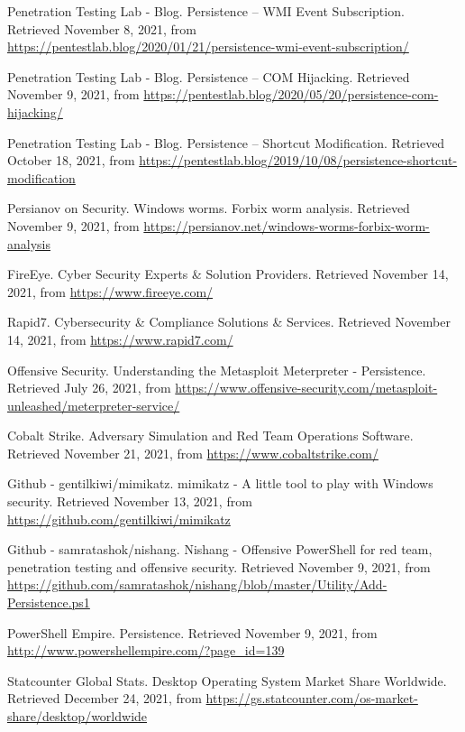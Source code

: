 \begin{thebibliography}{99}
Penetration Testing Lab - Blog.
Persistence – WMI Event Subscription.
Retrieved November 8, 2021, from \url{https://pentestlab.blog/2020/01/21/persistence-wmi-event-subscription/}

Penetration Testing Lab - Blog.
Persistence – COM Hijacking.
Retrieved November 9, 2021, from \url{https://pentestlab.blog/2020/05/20/persistence-com-hijacking/}

Penetration Testing Lab - Blog.
Persistence – Shortcut Modification.
Retrieved October 18, 2021, from \url{https://pentestlab.blog/2019/10/08/persistence-shortcut-modification}

Persianov on Security.
Windows worms. Forbix worm analysis.
Retrieved November 9, 2021, from \url{https://persianov.net/windows-worms-forbix-worm-analysis}

FireEye.
Cyber Security Experts \& Solution Providers.
Retrieved November 14, 2021, from \url{https://www.fireeye.com/}

Rapid7.
Cybersecurity \& Compliance Solutions \& Services.
Retrieved November 14, 2021, from \url{https://www.rapid7.com/}

Offensive Security.
Understanding the Metasploit Meterpreter - Persistence.
Retrieved July 26, 2021, from \url{https://www.offensive-security.com/metasploit-unleashed/meterpreter-service/}

Cobalt Strike.
Adversary Simulation and Red Team Operations Software.
Retrieved November 21, 2021, from \url{https://www.cobaltstrike.com/}

Github - gentilkiwi/mimikatz.
mimikatz - A little tool to play with Windows security.
Retrieved November 13, 2021, from \url{https://github.com/gentilkiwi/mimikatz}

Github - samratashok/nishang. 
Nishang - Offensive PowerShell for red team, penetration testing and offensive security.
Retrieved November 9, 2021, from \url{https://github.com/samratashok/nishang/blob/master/Utility/Add-Persistence.ps1}

PowerShell Empire. 
Persistence.
Retrieved November 9, 2021, from \url{http://www.powershellempire.com/?page_id=139}

Statcounter Global Stats. 
Desktop Operating System Market Share Worldwide.
Retrieved December 24, 2021, from \url{https://gs.statcounter.com/os-market-share/desktop/worldwide}



\end{thebibliography}
